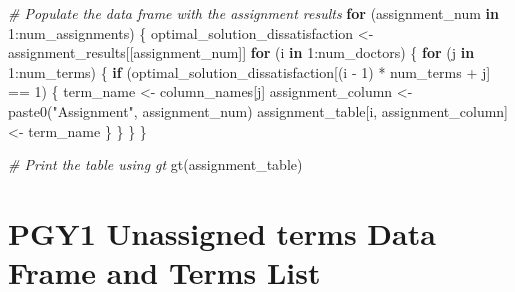 \documentclass[
]{article}
\newenvironment{Shaded}{\begin{snugshade}}{\end{snugshade}}
\newcommand{\CommentTok}[1]{\textcolor[rgb]{0.56,0.35,0.01}{\textit{#1}}}
\newcommand{\ControlFlowTok}[1]{\textcolor[rgb]{0.13,0.29,0.53}{\textbf{#1}}}
\newcommand{\DecValTok}[1]{\textcolor[rgb]{0.00,0.00,0.81}{#1}}
\newcommand{\FunctionTok}[1]{\textcolor[rgb]{0.00,0.00,0.00}{#1}}
\newcommand{\NormalTok}[1]{#1}
\newcommand{\OtherTok}[1]{\textcolor[rgb]{0.56,0.35,0.01}{#1}}
\newcommand{\SpecialCharTok}[1]{\textcolor[rgb]{0.00,0.00,0.00}{#1}}
\newcommand{\StringTok}[1]{\textcolor[rgb]{0.31,0.60,0.02}{#1}}
\begin{document}
\begin{Shaded}
\begin{Highlighting}[]
\CommentTok{\# Populate the data frame with the assignment results}
\ControlFlowTok{for}\NormalTok{ (assignment\_num }\ControlFlowTok{in} \DecValTok{1}\SpecialCharTok{:}\NormalTok{num\_assignments) \{}
\NormalTok{  optimal\_solution\_dissatisfaction }\OtherTok{\textless{}{-}}\NormalTok{ assignment\_results[[assignment\_num]]}
  \ControlFlowTok{for}\NormalTok{ (i }\ControlFlowTok{in} \DecValTok{1}\SpecialCharTok{:}\NormalTok{num\_doctors) \{}
    \ControlFlowTok{for}\NormalTok{ (j }\ControlFlowTok{in} \DecValTok{1}\SpecialCharTok{:}\NormalTok{num\_terms) \{}
      \ControlFlowTok{if}\NormalTok{ (optimal\_solution\_dissatisfaction[(i }\SpecialCharTok{{-}} \DecValTok{1}\NormalTok{) }\SpecialCharTok{*}\NormalTok{ num\_terms }\SpecialCharTok{+}\NormalTok{ j] }\SpecialCharTok{==} \DecValTok{1}\NormalTok{) \{}
\NormalTok{        term\_name }\OtherTok{\textless{}{-}}\NormalTok{ column\_names[j]}
\NormalTok{        assignment\_column }\OtherTok{\textless{}{-}} \FunctionTok{paste0}\NormalTok{(}\StringTok{"Assignment"}\NormalTok{, assignment\_num)}
\NormalTok{        assignment\_table[i, assignment\_column] }\OtherTok{\textless{}{-}}\NormalTok{ term\_name}
\NormalTok{      \}}
\NormalTok{    \}}
\NormalTok{  \}}
\NormalTok{\}}


\CommentTok{\# Print the table using gt}
\FunctionTok{gt}\NormalTok{(assignment\_table)}
\end{Highlighting}
\end{Shaded}

\hypertarget{pgy1-unassigned-terms-data-frame-and-terms-list}{%
\section{PGY1 Unassigned terms Data Frame and Terms
List}\label{pgy1-unassigned-terms-data-frame-and-terms-list}}
\end{document}
